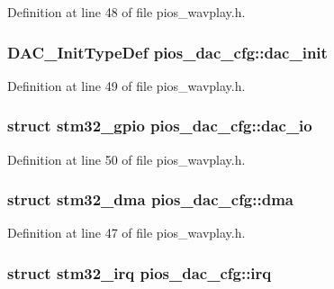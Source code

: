 Definition at line 48 of file pios\-\_\-wavplay.\-h.

\hypertarget{group___p_i_o_s___w_a_v_p_l_a_y_ga2da6286f80191750fd6960a67d4a1e20}{
\subsubsection[{dac\-\_\-init}]{\setlength{\rightskip}{0pt plus 5cm}D\-A\-C\-\_\-\-Init\-Type\-Def pios\-\_\-dac\-\_\-cfg\-::dac\-\_\-init}}\label{group___p_i_o_s___w_a_v_p_l_a_y_ga2da6286f80191750fd6960a67d4a1e20}


Definition at line 49 of file pios\-\_\-wavplay.\-h.

\hypertarget{group___p_i_o_s___w_a_v_p_l_a_y_gae02d1c0fa0764b2cf3172a8d3582295f}{
\subsubsection[{dac\-\_\-io}]{\setlength{\rightskip}{0pt plus 5cm}struct {\bf stm32\-\_\-gpio} pios\-\_\-dac\-\_\-cfg\-::dac\-\_\-io}}\label{group___p_i_o_s___w_a_v_p_l_a_y_gae02d1c0fa0764b2cf3172a8d3582295f}


Definition at line 50 of file pios\-\_\-wavplay.\-h.

\hypertarget{group___p_i_o_s___w_a_v_p_l_a_y_ga9794db8fe6627bb998ba905f5ec5b869}{
\subsubsection[{dma}]{\setlength{\rightskip}{0pt plus 5cm}struct {\bf stm32\-\_\-dma} pios\-\_\-dac\-\_\-cfg\-::dma}}\label{group___p_i_o_s___w_a_v_p_l_a_y_ga9794db8fe6627bb998ba905f5ec5b869}


Definition at line 47 of file pios\-\_\-wavplay.\-h.

\hypertarget{group___p_i_o_s___w_a_v_p_l_a_y_ga1db4430fc674d954d396ce5abf14307c}{
\subsubsection[{irq}]{\setlength{\rightskip}{0pt plus 5cm}struct {\bf stm32\-\_\-irq} pios\-\_\-dac\-\_\-cfg\-::irq}}\label{group___p_i_o_s___w_a_v_p_l_a_y_ga1db4430fc674d954d396ce5abf14307c}


